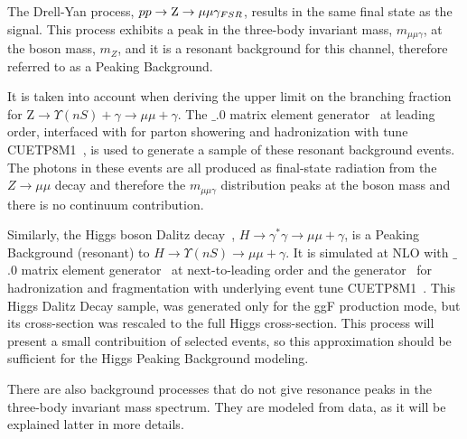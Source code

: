 The Drell-Yan process, $pp \rightarrow \mathrm{Z} \rightarrow \mu\mu \gamma_{FSR}$, results in the same final state as the signal. This process exhibits a peak in the three-body invariant mass, $m_{\mu\mu\gamma}$, at the \Z boson mass, $m_{Z}$, and it is a resonant background for this channel, therefore referred to as a Peaking Background. 

It is taken into account when deriving the upper limit on the branching fraction for Z$\rightarrow \Upsilon(nS) + \gamma \rightarrow \mu\mu + \gamma$. The  $\_$.0 matrix element generator~\cite{Alwall2014} at leading order, interfaced with  for parton showering and hadronization with tune CUETP8M1~\cite{Khachatryan:2015pea}, is used to generate a sample of these resonant background events. The photons in these events are all produced as final-state radiation from the $ Z \rightarrow \mu\mu$ decay and therefore the $m_{\mu\mu\gamma}$ distribution peaks at the \Z boson mass and there is no continuum contribution.  

Similarly, the Higgs boson Dalitz decay~\cite{PhysRevD.55.5647}, $H \rightarrow \gamma^{*} \gamma\rightarrow \mu\mu + \gamma$, is a Peaking Background (resonant) to $H \rightarrow \Upsilon(nS) \rightarrow \mu\mu + \gamma$. It is simulated at NLO with  $\_$.0 matrix element generator~\cite{Alwall2014} at next-to-leading order and the  generator~\cite{SJOSTRAND2008852,Sjostrand:2014zea} for hadronization and fragmentation with underlying event tune CUETP8M1~\cite{Khachatryan:2015pea}. This Higgs Dalitz Decay sample, was generated only for the ggF production mode, but its cross-section was rescaled to the full Higgs cross-section. This process will present a small contribuition of selected events, so this approximation should be sufficient for the Higgs Peaking Background modeling.

There are also background processes that do not give resonance peaks in the three-body invariant mass spectrum. They are modeled from data, as it will be explained latter in more details.
 
